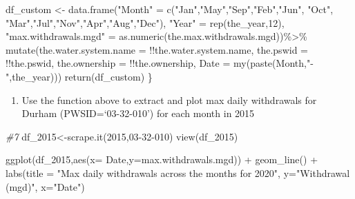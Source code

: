 \documentclass[
]{article}
\newenvironment{Shaded}{\begin{snugshade}}{\end{snugshade}}
\newcommand{\AttributeTok}[1]{\textcolor[rgb]{0.77,0.63,0.00}{#1}}
\newcommand{\CommentTok}[1]{\textcolor[rgb]{0.56,0.35,0.01}{\textit{#1}}}
\newcommand{\DecValTok}[1]{\textcolor[rgb]{0.00,0.00,0.81}{#1}}
\newcommand{\FunctionTok}[1]{\textcolor[rgb]{0.00,0.00,0.00}{#1}}
\newcommand{\NormalTok}[1]{#1}
\newcommand{\OtherTok}[1]{\textcolor[rgb]{0.56,0.35,0.01}{#1}}
\newcommand{\SpecialCharTok}[1]{\textcolor[rgb]{0.00,0.00,0.00}{#1}}
\newcommand{\StringTok}[1]{\textcolor[rgb]{0.31,0.60,0.02}{#1}}
\providecommand{\tightlist}{%
  \setlength{\itemsep}{0pt}\setlength{\parskip}{0pt}}
\begin{document}
\begin{Shaded}
\begin{Highlighting}[]
\NormalTok{  df\_custom }\OtherTok{\textless{}{-}} \FunctionTok{data.frame}\NormalTok{(}\StringTok{"Month"} \OtherTok{=} \FunctionTok{c}\NormalTok{(}\StringTok{"Jan"}\NormalTok{,}\StringTok{"May"}\NormalTok{,}\StringTok{"Sep"}\NormalTok{,}\StringTok{"Feb"}\NormalTok{,}\StringTok{"Jun"}\NormalTok{, }\StringTok{"Oct"}\NormalTok{, }\StringTok{"Mar"}\NormalTok{,}\StringTok{"Jul"}\NormalTok{,}\StringTok{"Nov"}\NormalTok{,}\StringTok{"Apr"}\NormalTok{,}\StringTok{"Aug"}\NormalTok{,}\StringTok{"Dec"}\NormalTok{),}
                        \StringTok{"Year"} \OtherTok{=} \FunctionTok{rep}\NormalTok{(the\_year,}\DecValTok{12}\NormalTok{),}
                        \StringTok{"max.withdrawals.mgd"} \OtherTok{=} \FunctionTok{as.numeric}\NormalTok{(the.max.withdrawals.mgd))}\SpecialCharTok{\%\textgreater{}\%}
    \FunctionTok{mutate}\NormalTok{(}\AttributeTok{the.water.system.name =} \SpecialCharTok{!!}\NormalTok{the.water.system.name,}
         \AttributeTok{the.pswid =} \SpecialCharTok{!!}\NormalTok{the.pswid,}
         \AttributeTok{the.ownership =} \SpecialCharTok{!!}\NormalTok{the.ownership,}
         \AttributeTok{Date =} \FunctionTok{my}\NormalTok{(}\FunctionTok{paste}\NormalTok{(Month,}\StringTok{"{-}"}\NormalTok{,the\_year)))}
  \FunctionTok{return}\NormalTok{(df\_custom)}
\NormalTok{\}}
\end{Highlighting}
\end{Shaded}

\begin{enumerate}
\def\labelenumi{\arabic{enumi}.}
\setcounter{enumi}{6}
\tightlist
\item
  Use the function above to extract and plot max daily withdrawals for
  Durham (PWSID=`03-32-010') for each month in 2015
\end{enumerate}

\begin{Shaded}
\begin{Highlighting}[]
\CommentTok{\#7}
\NormalTok{df\_2015}\OtherTok{\textless{}{-}}\FunctionTok{scrape.it}\NormalTok{(}\DecValTok{2015}\NormalTok{,}\StringTok{\textquotesingle{}03{-}32{-}010\textquotesingle{}}\NormalTok{)}
\FunctionTok{view}\NormalTok{(df\_2015)}

\FunctionTok{ggplot}\NormalTok{(df\_2015,}\FunctionTok{aes}\NormalTok{(}\AttributeTok{x=}\NormalTok{ Date,}\AttributeTok{y=}\NormalTok{max.withdrawals.mgd)) }\SpecialCharTok{+} 
  \FunctionTok{geom\_line}\NormalTok{() }\SpecialCharTok{+} 
  \FunctionTok{labs}\NormalTok{(}\AttributeTok{title =} \StringTok{"Max daily withdrawals across the months for 2020"}\NormalTok{,}
       \AttributeTok{y=}\StringTok{"Withdrawal (mgd)"}\NormalTok{,}
       \AttributeTok{x=}\StringTok{"Date"}\NormalTok{)}
\end{Highlighting}
\end{Shaded}
\end{document}
